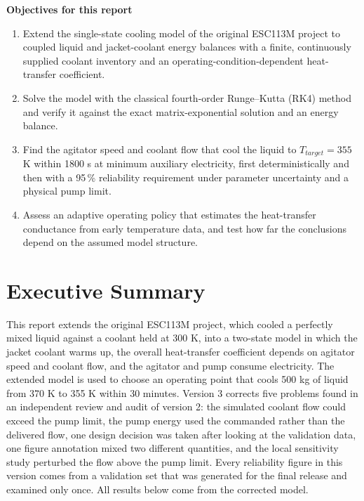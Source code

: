 \documentclass[11pt,letterpaper]{article}
\begin{document}
\vspace{6pt}
\noindent\textbf{Objectives for this report}
\begin{enumerate}[leftmargin=*,label=\arabic*.]
\item Extend the single-state cooling model of the original ESC113M project to coupled liquid and jacket-coolant energy balances with a finite, continuously supplied coolant inventory and an operating-condition-dependent heat-transfer coefficient.
\item Solve the model with the classical fourth-order Runge--Kutta (RK4) method and verify it against the exact matrix-exponential solution and an energy balance.
\item Find the agitator speed and coolant flow that cool the liquid to \(T_{target}=355\) K within 1800 s at minimum auxiliary electricity, first deterministically and then with a 95\,\% reliability requirement under parameter uncertainty and a physical pump limit.
\item Assess an adaptive operating policy that estimates the heat-transfer conductance from early temperature data, and test how far the conclusions depend on the assumed model structure.
\end{enumerate}

\section{Executive Summary}

This report extends the original ESC113M project, which cooled a perfectly mixed liquid against a coolant held at 300 K, into a two-state model in which the jacket coolant warms up, the overall heat-transfer coefficient depends on agitator speed and coolant flow, and the agitator and pump consume electricity. The extended model is used to choose an operating point that cools 500 kg of liquid from 370 K to 355 K within 30 minutes. Version 3 corrects five problems found in an independent review and audit of version 2: the simulated coolant flow could exceed the pump limit, the pump energy used the commanded rather than the delivered flow, one design decision was taken after looking at the validation data, one figure annotation mixed two different quantities, and the local sensitivity study perturbed the flow above the pump limit. Every reliability figure in this version comes from a validation set that was generated for the final release and examined only once. All results below come from the corrected model.
\end{document}
